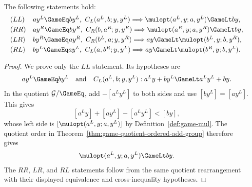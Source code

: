 \begin{lemma}
  \label{lem:mulopt-bounds}
  \leanok
  The following statements hold:
  \[
    \begin{array}{ll}
      (LL)&ay^L\GameEq by^L,\ C_L(a^L,b;y,y^L)
        \Longrightarrow \mulopt(a^L,y;a,y^L)\GameLt by,\\[1mm]
      (RR)&ay^R\GameEq by^R,\ C_R(b,a^R;y,y^R)
        \Longrightarrow \mulopt(a^R,y;a,y^R)\GameLt by,\\[1mm]
      (LR)&by^R\GameEq ay^R,\ C_R(b^L,a;y,y^R)
        \Longrightarrow ay\GameLt\mulopt(b^L,y;b,y^R),\\[1mm]
      (RL)&by^L\GameEq ay^L,\ C_L(a,b^R;y,y^L)
        \Longrightarrow ay\GameLt\mulopt(b^R,y;b,y^L).
    \end{array}
  \]
\end{lemma}
\begin{proof}
  \leanok
  We prove only the \(LL\) statement.  Its hypotheses are
  \[
    ay^L\GameEq by^L
    \quad\text{and}\quad
    C_L(a^L,b;y,y^L):
    a^Ly+by^L\GameLt a^Ly^L+by.
  \]
  In the quotient \(\mathcal G/{\GameEq}\), add \(-[a^Ly^L]\) to both sides and use
  \([by^L]=[ay^L]\).  This gives
  \[
    [a^Ly]+[ay^L]-[a^Ly^L]<[by],
  \]
  whose left side is \([\mulopt(a^L,y;a,y^L)]\) by
  Definition~\ref{def:game-mul}.  The quotient order in
  Theorem~\ref{thm:game-quotient-ordered-add-group} therefore gives
  \[
    \mulopt(a^L,y;a,y^L)\GameLt by.
  \]
  The \(RR\), \(LR\), and \(RL\) statements follow from the same quotient
  rearrangement with their displayed equivalence and cross-inequality hypotheses.
\end{proof}

